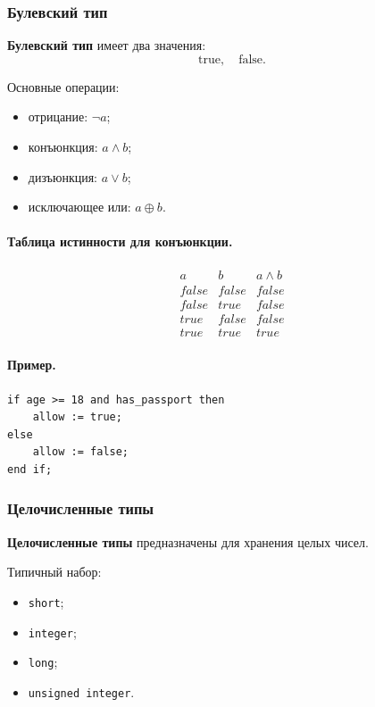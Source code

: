 \documentclass[12pt,a4paper]{article}
\begin{document}
\subsubsection{Булевский тип}

\textbf{Булевский тип} имеет два значения:
\[
    \text{true}, \quad \text{false}.
\]

Основные операции:
\begin{itemize}
    \item отрицание: $\neg a$;
    \item конъюнкция: $a \land b$;
    \item дизъюнкция: $a \lor b$;
    \item исключающее или: $a \oplus b$.
\end{itemize}

\paragraph{Таблица истинности для конъюнкции.}

\[
\begin{array}{c|c|c}
a & b & a \land b\\
\hline
false & false & false\\
false & true & false\\
true & false & false\\
true & true & true
\end{array}
\]

\paragraph{Пример.}

\begin{verbatim}
if age >= 18 and has_passport then
    allow := true;
else
    allow := false;
end if;
\end{verbatim}

\subsubsection{Целочисленные типы}

\textbf{Целочисленные типы} предназначены для хранения целых чисел.

Типичный набор:
\begin{itemize}
    \item \texttt{short};
    \item \texttt{integer};
    \item \texttt{long};
    \item \texttt{unsigned integer}.
\end{itemize}
\end{document}
